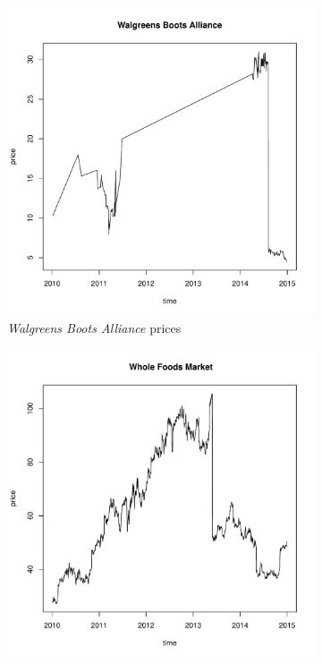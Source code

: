 \documentclass{article}
\newcommand{\1}[1]{
  \mathbf{1}_{\{#1\}}
}
\begin{document}
\begin{figure}[htb!]
  \centering
  \begin{subfigure}{0.45\textwidth}
    \includegraphics[width=\textwidth]{WBA_price.pdf}
    \caption{{\it Walgreens Boots Alliance} prices}
    \label{fig:EBA_prices}
  \end{subfigure}
  \begin{subfigure}{0.45\textwidth}
    \includegraphics[width=\textwidth]{WFM_price.pdf}

\end{subfigure}
\end{figure}
\end{document}
